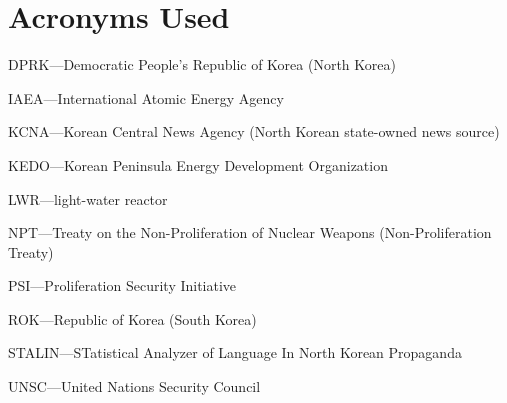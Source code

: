 \chapter*{Acronyms Used}

DPRK---Democratic People's Republic of Korea (North Korea)

\noindent IAEA---International Atomic Energy Agency

\noindent KCNA---Korean Central News Agency (North Korean state-owned news source)

\noindent KEDO---Korean Peninsula Energy Development Organization

\noindent LWR---light-water reactor

\noindent NPT---Treaty on the Non-Proliferation of Nuclear Weapons (Non-Proliferation Treaty)

\noindent PSI---Proliferation Security Initiative

\noindent ROK---Republic of Korea (South Korea)

\noindent STALIN---STatistical Analyzer of Language In North Korean Propaganda

\noindent UNSC---United Nations Security Council